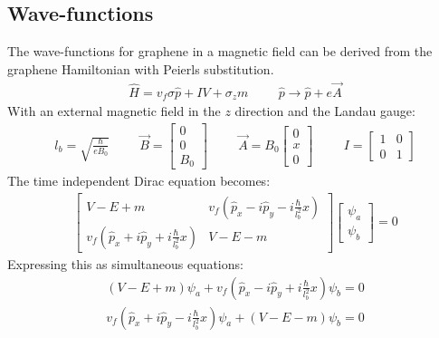 			\subsection{Wave-functions}
			\label{Wave-functions - Magnetic Field}
				The wave-functions for graphene in a magnetic field can be derived from the graphene Hamiltonian with Peierls substitution.
				\begin{align}
					\hat{H}=v_{f}\sigma \hat{p}+IV+\sigma_{z}m\hspace{1cm}\hat{p}\rightarrow \hat{p}+e\vec{A}
				\end{align}
				With an external magnetic field in the $z$ direction and the Landau gauge:
				\begin{align}
					l_{b}=\sqrt{\frac{\hbar}{eB_{0}}}
					\hspace{1cm}\vec{B}=
					\left[\begin{array}{ccc}
						0\\
						0\\	
						B_{0}
					\end{array}\right]
					\hspace{1cm}\vec{A}=B_{0}
					\left[\begin{array}{ccc}
						0\\
						x\\
						0
					\end{array}\right]
					\hspace{1cm}I=\left[\begin{array}{ccc}
						1 & 0\\
						0 & 1
					\end{array}\right]
				\end{align}
				The time independent Dirac equation becomes:
				\begin{align}
					\left[\begin{array}{ccc}
						V-E+m&v_{f}\left(\hat{p}_{x}-i\hat{p}_{y}-i\frac{\hbar}{l_{b}^{2}}x\right)\\
						v_{f}\left(\hat{p}_{x}+i\hat{p}_{y}+i\frac{\hbar}{l_{b}^{2}}x\right)&V-E-m
					\end{array}\right]
					\left[\begin{array}{ccc}
						\psi_{a}\\
						\psi_{b}
					\end{array}\right]=0
				\end{align}
				Expressing this as simultaneous equations:
				\begin{align}
					\left(V-E+m\right)\psi_{a}+v_{f}\left(\hat{p}_{x}-i\hat{p}_{y}+i\frac{\hbar}{l_{b}^{2}}x\right)\psi_{b}=0\\
					v_{f}\left(\hat{p}_{x}+i\hat{p}_{y}-i\frac{\hbar}{l_{b}^{2}}x\right)\psi_{a}+\left(V-E-m\right)\psi_{b}=0
				\end{align}
